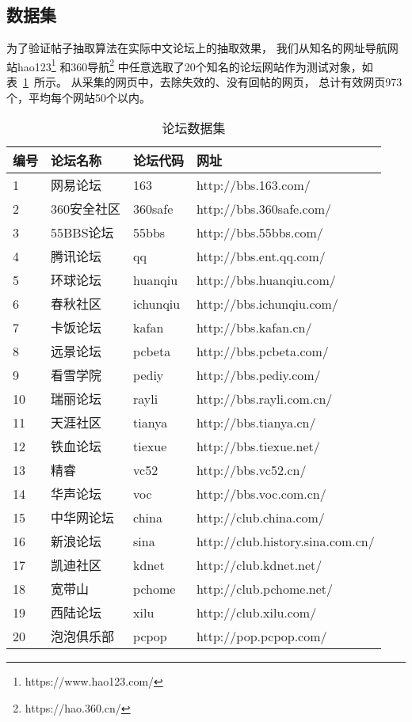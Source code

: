 \subsection{数据集}
为了验证帖子抽取算法在实际中文论坛上的抽取效果，
我们从知名的网址导航网站hao123\footnote{https://www.hao123.com/}
和360导航\footnote{https://hao.360.cn/}
中任意选取了20个知名的论坛网站作为测试对象，如表~\ref{tbl:forum-dataset}~所示。
从采集的网页中，去除失效的、没有回帖的网页，
总计有效网页973个，平均每个网站50个以内。

\begin{table}[htbp]
\caption{论坛数据集}
\label{tbl:forum-dataset}
\vspace{0.5em}\centering\wuhao
\begin{tabular}{llll}
\toprule[1.5pt]
编号 & 论坛名称 & 论坛代码 & 网址 \\
\midrule[1pt]
1 & 网易论坛 & 163 & http://bbs.163.com/ \\
2 & 360安全社区 & 360safe & http://bbs.360safe.com/ \\
3 & 55BBS论坛 & 55bbs & http://bbs.55bbs.com/ \\
4 & 腾讯论坛 & qq & http://bbs.ent.qq.com/ \\
5 & 环球论坛 & huanqiu & http://bbs.huanqiu.com/ \\
6 & 春秋社区 & ichunqiu & http://bbs.ichunqiu.com/ \\
7 & 卡饭论坛 & kafan & http://bbs.kafan.cn/ \\
8 & 远景论坛 & pcbeta & http://bbs.pcbeta.com/ \\
9 & 看雪学院 & pediy & http://bbs.pediy.com/ \\
10 & 瑞丽论坛 & rayli & http://bbs.rayli.com.cn/ \\
11 & 天涯社区 & tianya & http://bbs.tianya.cn/ \\
12 & 铁血论坛 & tiexue & http://bbs.tiexue.net/ \\
13 & 精睿 & vc52 & http://bbs.vc52.cn/ \\
14 & 华声论坛 & voc & http://bbs.voc.com.cn/ \\
15 & 中华网论坛 & china & http://club.china.com/ \\
16 & 新浪论坛 & sina & http://club.history.sina.com.cn/ \\
17 & 凯迪社区 & kdnet & http://club.kdnet.net/ \\
18 & 宽带山 & pchome & http://club.pchome.net/ \\
19 & 西陆论坛 & xilu & http://club.xilu.com/ \\
20 & 泡泡俱乐部 & pcpop & http://pop.pcpop.com/ \\
\bottomrule[1.5pt]
\end{tabular}
\end{table}

